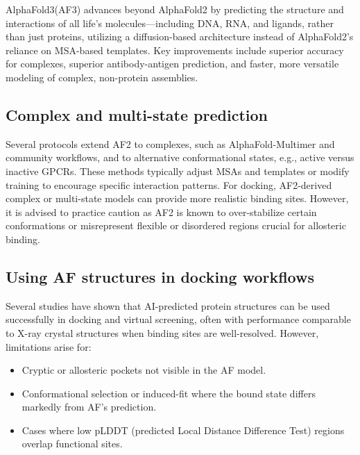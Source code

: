\documentclass[12pt]{article}
\begin{document}
AlphaFold3(AF3) \cite{CH13_abramson2024accurate} advances beyond AlphaFold2 by predicting the structure and interactions of all life's molecules—including DNA, RNA, and ligands, rather than just proteins, utilizing a diffusion-based architecture instead of AlphaFold2’s reliance on MSA-based templates. Key improvements include superior accuracy for complexes, superior antibody-antigen prediction, and faster, more versatile modeling of complex, non-protein assemblies. 

\subsection{Complex and multi-state prediction}

Several protocols extend AF2 to complexes, such as AlphaFold-Multimer and community workflows, and to alternative conformational states, e.g., active versus inactive GPCRs.\cite{CH13_multistategpcr2021,CH13_proteinpredictionuntilcasp15} These methods typically adjust MSAs and templates or modify training to encourage specific interaction patterns. For docking, AF2-derived complex or multi-state models can provide more realistic binding sites. However, it is advised to practice caution as AF2 is known to over-stabilize certain conformations or misrepresent flexible or disordered regions crucial for allosteric binding.\cite{CH13_alphafoldimpact2022,CH13_alphafoldlimitations2023,CH13_deepallostery2024}

\subsection{Using AF structures in docking workflows}

Several studies have shown that AI-predicted protein structures can be used successfully in docking and virtual screening, often with performance comparable to X-ray crystal structures when binding sites are well-resolved.\cite{CH13_humanproteome2021,CH13_alphafoldimpact2022} However, limitations arise for:
\begin{itemize}
  \item Cryptic or allosteric pockets not visible in the AF model.
  \item Conformational selection or induced-fit where the bound state differs markedly from AF’s prediction.
  \item Cases where low pLDDT (predicted Local Distance Difference Test) regions overlap functional sites.
\end{itemize}
\end{document}
